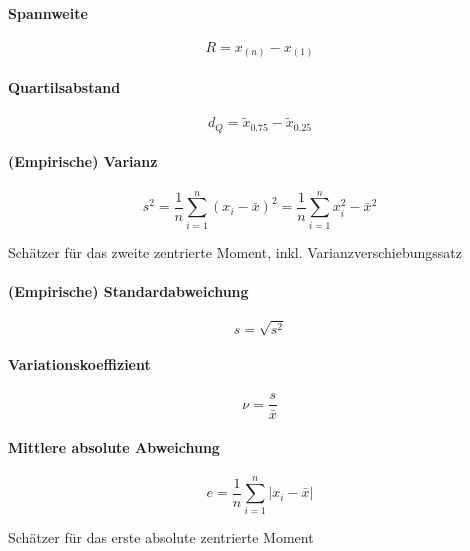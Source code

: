 \documentclass[10pt]{article}
\begin{document}
\begin{multicols}{2}

\paragraph{Spannweite}

$$R=x_{(n)}-x_{(1)}$$

\paragraph{Quartilsabstand}

$$d_Q=\tilde{x}_{0.75}-\tilde{x}_{0.25}$$

\paragraph{(Empirische) Varianz}

$$s^2=\frac{1}{n}\sum\limits_{i=1}^n(x_i-\bar{x})^2=\frac{1}{n}\sum\limits_{i=1}^nx_i^2-\bar{x}^2$$

\noindent Schätzer für das zweite zentrierte Moment, inkl. Varianzverschiebungssatz

\paragraph{(Empirische) Standardabweichung}

$$s=\sqrt{s^2}$$

\paragraph{Variationskoeffizient}

$$ \nu=\frac{s}{\bar{x}}$$

\paragraph{Mittlere absolute Abweichung}


$$ \mathit{e} = \frac{1}{n}\sum_{i=1}^n \left|x_i - \bar{x}\right|$$

\noindent Schätzer für das erste absolute zentrierte Moment 





\end{multicols}
\end{document}
